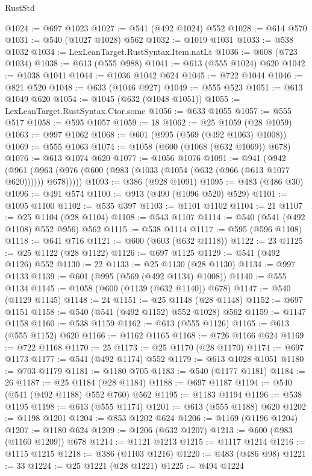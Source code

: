 \begin{lexlean}{RustStd}
\begin{coremodule}
@1024 := @697 @1023
@1027 := @541 (@492 @1024) @552
@1028 := @614 @570
@1031 := @540 (@1027 @1028) @562
@1032 := @1019 @1031
@1033 := @538 @1032
@1034 := LexLeanTarget.RustSyntax.Item.natLt
@1036 := @608 (@723 @1034)
@1038 := @613 (@555 @988)
@1041 := @613 (@555 @1024) @620
@1042 := @1038 @1041
@1044 := @1036 @1042 @624
@1045 := @722 @1044
@1046 := @821 @520
@1048 := @633 (@1046 @927)
@1049 := @555 @523
@1051 := @613 @1049 @620
@1054 := @1045 (@632 (@1048 @1051))
@1055 := LexLeanTarget.RustSyntax.Ctor.some
@1056 := @633 @1055
@1057 := @555 @517
@1058 := @595 @1057
@1059 := 18
@1062 := @25 @1059 (@28 @1059)
@1063 := @997 @1062
@1068 := @601 (@995 (@569 (@492 @1063) @1008))
@1069 := @555 @1063
@1074 := @1058 (@600 (@1068 (@632 @1069)) @678)
@1076 := @613 @1074 @620
@1077 := @1056 @1076
@1091 := @941
    (@942 (@961 (@963 (@976 (@600 (@983 (@1033 (@1054 (@632 (@966 (@613 @1077 @620)))))) @678)))))
@1093 := @386 (@928 @1091)
@1095 := @483 (@486 @30)
@1096 := @491 @574
@1100 := @913 (@490 (@1096 @520) @529)
@1101 := @1095 @1100
@1102 := @535 @397
@1103 := @1101 @1102
@1104 := 21
@1107 := @25 @1104 (@28 @1104)
@1108 := @543 @1107
@1114 := @540 (@541 (@492 @1108) @552 @956) @562
@1115 := @538 @1114
@1117 := @595 (@596 @1108)
@1118 := @641 @716
@1121 := @600 (@603 (@632 @1118))
@1122 := 23
@1125 := @25 @1122 (@28 @1122)
@1126 := @697 @1125
@1129 := @541 (@492 @1126) @552
@1130 := 22
@1133 := @25 @1130 (@28 @1130)
@1134 := @997 @1133
@1139 := @601 (@995 (@569 (@492 @1134) @1008))
@1140 := @555 @1134
@1145 := @1058 (@600 (@1139 (@632 @1140)) @678)
@1147 := @540 (@1129 @1145)
@1148 := 24
@1151 := @25 @1148 (@28 @1148)
@1152 := @697 @1151
@1158 := @540 (@541 (@492 @1152) @552 @1028) @562
@1159 := @1147 @1158
@1160 := @538 @1159
@1162 := @613 (@555 @1126)
@1165 := @613 (@555 @1152) @620
@1166 := @1162 @1165
@1168 := @726 @1166 @624
@1169 := @722 @1168
@1170 := 25
@1173 := @25 @1170 (@28 @1170)
@1174 := @697 @1173
@1177 := @541 (@492 @1174) @552
@1179 := @613 @1028 @1051
@1180 := @703 @1179
@1181 := @1180 @705
@1183 := @540 (@1177 @1181)
@1184 := 26
@1187 := @25 @1184 (@28 @1184)
@1188 := @697 @1187
@1194 := @540 (@541 (@492 @1188) @552 @760) @562
@1195 := @1183 @1194
@1196 := @538 @1195
@1198 := @613 (@555 @1174)
@1201 := @613 (@555 @1188) @620
@1202 := @1198 @1201
@1204 := @853 @1202 @624
@1206 := @1169 (@1196 @1204)
@1207 := @1180 @624
@1209 := @1206 (@632 @1207)
@1213 := @600 (@983 (@1160 @1209)) @678
@1214 := @1121 @1213
@1215 := @1117 @1214
@1216 := @1115 @1215
@1218 := @386 (@1103 @1216)
@1220 := @483 (@486 @98)
@1221 := 33
@1224 := @25 @1221 (@28 @1221)
@1225 := @494 @1224

\end{coremodule}
\end{lexlean}
